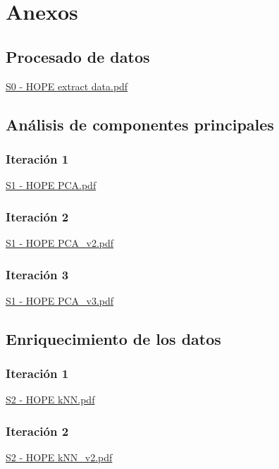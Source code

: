 \chapter{Anexos}
\label{chapter:anexos}


\section{Procesado de datos}
\label{anx01:procesado_datos}
\href{file://./anexos/S0 - HOPE extract data.pdf}{S0 - HOPE extract data.pdf}

\section{Análisis de componentes principales}
\label{anx02:pca}
\subsection{Iteración 1}
\label{anx02:pca1}
\href{file://./anexos/S1 - HOPE PCA.pdf}{S1 - HOPE PCA.pdf}

\subsection{Iteración 2}
\label{anx02:pca2}
\href{file://./anexos/S1 - HOPE PCA_v2.pdf}{S1 - HOPE PCA\_v2.pdf}

\subsection{Iteración 3}
\label{anx02:pca3}
\href{file://./anexos/S1 - HOPE PCA_v3.pdf}{S1 - HOPE PCA\_v3.pdf}

\section{Enriquecimiento de los datos}
\label{anx03:knn}
\subsection{Iteración 1}
\label{anx03:knn1}
\href{file://./anexos/S2 - HOPE kNN.pdf}{S2 - HOPE kNN.pdf}

\subsection{Iteración 2}
\label{anx03:knn2}
\href{file://./anexos/S2 - HOPE kNN_v2.pdf}{S2 - HOPE kNN\_v2.pdf}